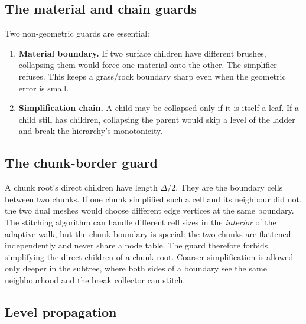 \subsection{The material and chain guards}

Two non-geometric guards are essential:

\begin{enumerate}
\item \textbf{Material boundary.}  If two surface children have different
  brushes, collapsing them would force one material onto the other.  The
  simplifier refuses.  This keeps a grass/rock boundary sharp even when the
  geometric error is small.
\item \textbf{Simplification chain.}  A child may be collapsed only if it is
  itself a leaf.  If a child still has children, collapsing the parent
  would skip a level of the ladder and break the hierarchy's monotonicity.
\end{enumerate}

\subsection{The chunk-border guard}

A chunk root's direct children have length $\Delta/2$.  They are the
boundary cells between two chunks.  If one chunk simplified such a cell and
its neighbour did not, the two dual meshes would choose different edge
vertices at the same boundary.  The stitching algorithm can handle
different cell sizes in the \emph{interior} of the adaptive walk, but the
chunk boundary is special: the two chunks are flattened independently and
never share a node table.  The guard therefore forbids simplifying the
direct children of a chunk root.  Coarser simplification is allowed only
deeper in the subtree, where both sides of a boundary see the same
neighbourhood and the break collector can stitch.

\subsection{Level propagation}

